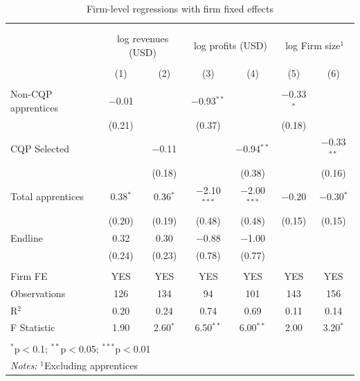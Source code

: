\documentclass[
  a4paper, twoside, 12pt]{book}
\begin{document}
\begin{landscape}
\end{landscape}

\begin{table}[H] \centering 
  \caption{Firm-level regressions with firm fixed effects} 
  \label{tab:firmregsfe} 
\footnotesize 
\begin{tabular}{@{\extracolsep{5pt}}lcccccc} 
\\[-1.8ex]\hline 
\hline \\[-1.8ex] 
\\[-1.8ex] & \multicolumn{2}{c}{log revenues (USD)} & \multicolumn{2}{c}{log profits (USD)} & \multicolumn{2}{c}{log Firm size$^1$} \\ 
\\[-1.8ex] & (1) & (2) & (3) & (4) & (5) & (6)\\ 
\hline \\[-1.8ex] 
 Non-CQP apprentices & $-$0.01 &  & $-$0.93$^{**}$ &  & $-$0.33$^{*}$ &  \\ 
  & (0.21) &  & (0.37) &  & (0.18) &  \\ 
  CQP Selected &  & $-$0.11 &  & $-$0.94$^{**}$ &  & $-$0.33$^{**}$ \\ 
  &  & (0.18) &  & (0.38) &  & (0.16) \\ 
  Total apprentices & 0.38$^{*}$ & 0.36$^{*}$ & $-$2.10$^{***}$ & $-$2.00$^{***}$ & $-$0.20 & $-$0.30$^{*}$ \\ 
  & (0.20) & (0.19) & (0.48) & (0.48) & (0.15) & (0.15) \\ 
  Endline & 0.32 & 0.30 & $-$0.88 & $-$1.00 &  &  \\ 
  & (0.24) & (0.23) & (0.78) & (0.77) &  &  \\ 
 \hline \\[-1.8ex] 
Firm FE & YES & YES & YES & YES & YES & YES \\ 
Observations & 126 & 134 & 94 & 101 & 143 & 156 \\ 
R$^{2}$ & 0.20 & 0.24 & 0.74 & 0.69 & 0.11 & 0.14 \\ 
F Statistic & 1.90 & 2.60$^{*}$ & 6.50$^{**}$ & 6.00$^{**}$ & 2.00 & 3.20$^{*}$ \\ 
\hline 
\hline \\[-1.8ex] 
\multicolumn{7}{l}{$^{*}$p$<$0.1; $^{**}$p$<$0.05; $^{***}$p$<$0.01} \\ 
\multicolumn{7}{l}{\textit{Notes:} $^1$Excluding apprentices} \\ 
\end{tabular} 
\end{table}

\newpage
\end{document}
